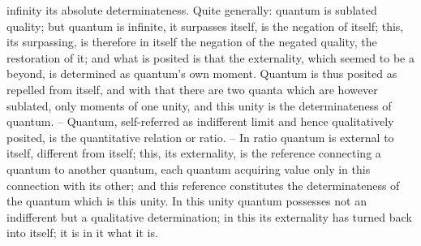 infinity its absolute determinateness.
Quite generally: quantum is sublated quality; but quantum is infinite, it
surpasses itself, is the negation of itself; this, its surpassing, is therefore in
itself the negation of the negated quality, the restoration of it; and what is
posited is that the externality, which seemed to be a beyond, is determined
as quantum’s own moment.
Quantum is thus posited as repelled from itself, and with that there are
two quanta which are however sublated, only moments of one unity, and
this unity is the determinateness of quantum. – Quantum, self-referred as
indifferent limit and hence qualitatively posited, is the quantitative relation
or ratio. – In ratio quantum is external to itself, different from itself; this,
its externality, is the reference connecting a quantum to another quantum,
each quantum acquiring value only in this connection with its other; and
this reference constitutes the determinateness of the quantum which is this
unity. In this unity quantum possesses not an indifferent but a qualitative
determination; in this its externality has turned back into itself; it is in it
what it is.

